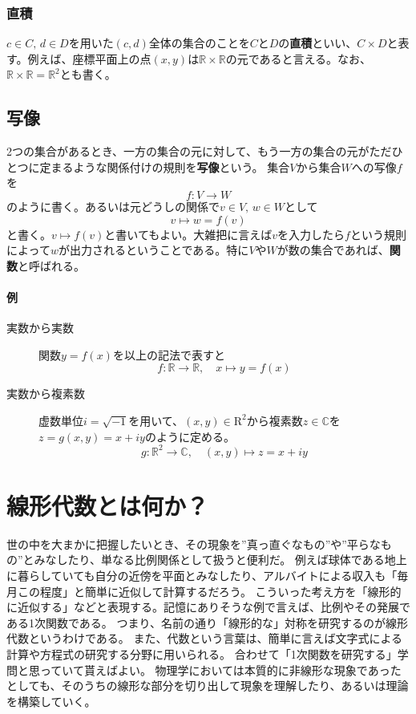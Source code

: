 \documentclass[10pt]{jsreport}
\theoremstyle{definition}%
\numberwithin{equation}{section}%
\begin{document}
\subsubsection{直積}
$c \in C, \, d\in D$を用いた$(c,d)$全体の集合のことを$C$と$D$の{\bf 直積}といい、$C\times D$と表す。例えば、座標平面上の点$(x,y)$は$\mathbb{R}\times \mathbb{R}$の元であると言える。なお、$\mathbb{R}\times \mathbb{R}=\mathbb{R}^{2}$とも書く。
\subsection{写像}
2つの集合があるとき、一方の集合の元に対して、もう一方の集合の元がただひとつに定まるような関係付けの規則を{\bf 写像}という。 
集合$V$から集合$W$への写像$f$を
\begin{equation}
  f:V \to W
\end{equation}
のように書く。あるいは元どうしの関係で$v\in V, \, w\in W$として
\begin{equation}
  v \mapsto w= f(v)
\end{equation}
と書く。$v \mapsto f(v)$と書いてもよい。大雑把に言えば$v$を入力したら$f$という規則によって$w$が出力されるということである。特に$V$や$W$が数の集合であれば、{\bf 関数}と呼ばれる。
\paragraph{例}
\begin{description}
  \item[実数から実数] 関数$y=f(x)$を以上の記法で表すと
  \begin{equation}
   f:\mathbb{R}\to\mathbb{R}, \quad x\mapsto y=f(x)
  \end{equation}
 \item[実数から複素数] 虚数単位$i=\sqrt{-1}$を用いて、$(x,y)\in \mathrm{R}^{2}$から複素数$z\in \mathbb{C}$を$z=g(x,y)=x+iy$のように定める。
 \begin{equation}
  g:\mathbb{R}^{2}\to \mathbb{C},\quad (x,y)\mapsto z=x+iy
 \end{equation}
 
\end{description}
\section{線形代数とは何か？}
世の中を大まかに把握したいとき、その現象を''真っ直ぐなもの''や''平らなもの''とみなしたり、単なる比例関係として扱うと便利だ。
例えば球体である地上に暮らしていても自分の近傍を平面とみなしたり、アルバイトによる収入も「毎月この程度」と簡単に近似して計算するだろう。
こういった考え方を「線形的に近似する」などと表現する。記憶にありそうな例で言えば、比例やその発展である1次関数である。
つまり、名前の通り「線形的な」対称を研究するのが線形代数というわけである。
また、代数という言葉は、簡単に言えば文字式による計算や方程式の研究する分野に用いられる。
合わせて「1次関数を研究する」学問と思っていて貰えばよい。
物理学においては本質的に非線形な現象であったとしても、そのうちの線形な部分を切り出して現象を理解したり、あるいは理論を構築していく。
\end{document}
